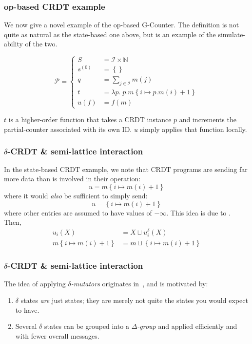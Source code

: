 \documentclass[aspectratio=169,compress]{beamer}
\begin{document}
  \begin{frame}
    \frametitle{op-based CRDT example}

    We now give a novel example of the op-based G-Counter. The definition is not
    quite as natural as the state-based one above, but is an example of the
    simulate-ability of the two.

    \[
      \mathcal{P} = \left\{\begin{aligned}
        S &= \mathcal{I} \times \mathbb{N} \\
        s^{(0)} &= \left\{ \right\} \\
        q &= \sum_{j \in \mathcal{I}} m(j) \\
        t &= \lambda p.\; p.m\left\{i \mapsto p.m(i) + 1 \right\} \\
        u(f) &= f(m)
      \end{aligned}\right.
    \]

    $t$ is a higher-order function that takes a CRDT instance $p$ and increments
    the partial-counter associated with its own ID. $u$ simply applies that
    function locally.
  \end{frame}

  \begin{frame}
    \frametitle{$\delta$-CRDT \& semi-lattice interaction}

    In the state-based CRDT example, we note that CRDT programs are sending far
    more data than is involved in their operation:
    \[
      u = m\left\{ i \mapsto m(i) + 1 \right\}
    \]
    where it would \textit{also} be sufficient to simply send:
    \[
      u = \left\{ i \mapsto m(i) + 1 \right\}
    \]
    where other entries are assumed to have values of $-\infty$. This idea is
    due to \cite{almeida16}. Then,
    \[
      \begin{aligned}
        u_i(X) &= X \sqcup u_i^\delta(X) \\
        m\left\{ i \mapsto m(i) + 1 \right\} &= m \sqcup \left\{ i \mapsto m(i) + 1 \right\}
      \end{aligned}
    \]
  \end{frame}

  \begin{frame}
    \frametitle{$\delta$-CRDT \& semi-lattice interaction}

    The idea of applying \textit{$\delta$-mutators} originates
    in~\cite{almeida16}, and is motivated by:
    \begin{enumerate}
      \item $\delta$ states \textit{are} just states; they are merely not quite
        the states you would expect to have.
      \item Several $\delta$ states can be grouped into a
        \textit{$\Delta$-group} and applied efficiently and with fewer overall
        messages.
    \end{enumerate}
  \end{frame}
\end{document}

